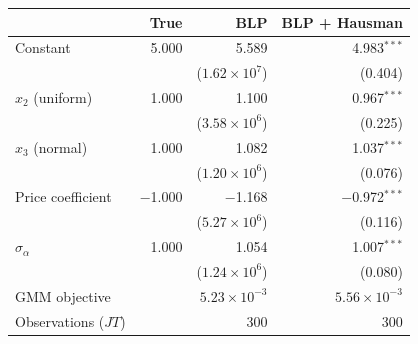 \begin{tabular}{lrrr}
\toprule
 & True & BLP & BLP + Hausman \\
\midrule
Constant & 5.000 & 5.589 & 4.983$^{***}$ \\
 &  & ($1.62\times10^{7}$) & (0.404) \\
$x_2$ (uniform) & 1.000 & 1.100 & 0.967$^{***}$ \\
 &  & ($3.58\times10^{6}$) & (0.225) \\
$x_3$ (normal) & 1.000 & 1.082 & 1.037$^{***}$ \\
 &  & ($1.20\times10^{6}$) & (0.076) \\
Price coefficient & $-$1.000 & $-$1.168 & $-$0.972$^{***}$ \\
 &  & ($5.27\times10^{6}$) & (0.116) \\
$\sigma_\alpha$ & 1.000 & 1.054 & 1.007$^{***}$ \\
 &  & ($1.24\times10^{6}$) & (0.080) \\
\midrule
GMM objective &  & $5.23\times10^{-3}$ & $5.56\times10^{-3}$ \\
Observations ($JT$) &  & 300 & 300 \\
\bottomrule
\end{tabular}
